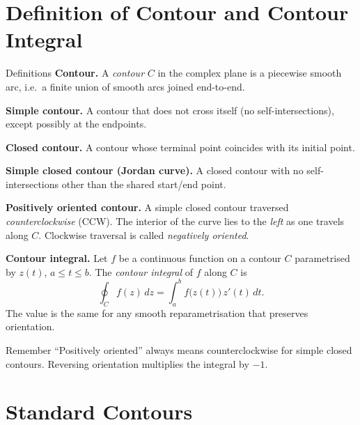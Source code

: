 \documentclass[12pt,a4paper]{article}
\begin{document}
\section{Definition of Contour and Contour Integral}

\begin{infobox}{Definitions}
\textbf{Contour.} A \emph{contour} $C$ in the complex plane is a piecewise smooth
arc, i.e.\ a finite union of smooth arcs joined end-to-end.

\medskip
\textbf{Simple contour.} A contour that does not cross itself (no
self-intersections), except possibly at the endpoints.

\medskip
\textbf{Closed contour.} A contour whose terminal point coincides with its
initial point.

\medskip
\textbf{Simple closed contour (Jordan curve).} A closed contour with no
self-intersections other than the shared start/end point.

\medskip
\textbf{Positively oriented contour.} A simple closed contour traversed
\emph{counterclockwise} (CCW). The interior of the curve lies to the
\emph{left} as one travels along $C$. Clockwise traversal is called
\emph{negatively oriented}.

\medskip
\textbf{Contour integral.} Let $f$ be a continuous function on a contour $C$
parametrised by $z(t)$, $a \le t \le b$. The \emph{contour integral} of $f$
along $C$ is
\[
  \oint_C f(z)\,dz = \int_a^b f\!\bigl(z(t)\bigr)\,z'(t)\,dt.
\]
The value is the same for any smooth reparametrisation that preserves
orientation.
\end{infobox}

\begin{learnbox}{Remember}
``Positively oriented'' always means counterclockwise for simple closed contours.
Reversing orientation multiplies the integral by $-1$.
\end{learnbox}

\section{Standard Contours}
\end{document}
